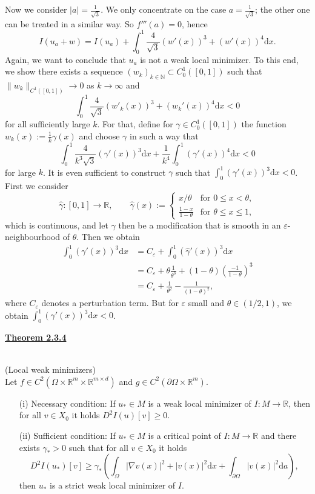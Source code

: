 \begin{itemize}
	Now we consider $\lvert a\rvert=\frac{1}{\sqrt{3}}$. We only concentrate on the case $a=\frac{1}{\sqrt{3}}$; the other one can be treated in a similar way. So $f'''(a)=0$, hence
	\[I(u_a+w)=I(u_a)+\int_0^1{\frac{4}{\sqrt{3}}(w'(x))^3+(w'(x))^4\mathrm{d}x}.\]
	Again, we want to conclude that $u_a$ is not a weak local minimizer. To this end, we show there exists a sequence $(w_k)_{k\in\mathbb{N}}\subset C_0^1([0,1])$ such that $\lVert w_k\rVert_{C^1([0,1])}\to0$ as $k\to\infty$ and
	\[\int_0^1{\frac{4}{\sqrt{3}}(w'_k(x))^3+(w_k'(x))^4\mathrm{d}x}<0\]
	for all sufficiently large $k$. For that, define for $\gamma\in C_0^1([0,1])$ the function $w_k(x):=\frac{1}{k}\gamma(x)$ and choose $\gamma$ in such a way that
	\[\int_0^1{\frac{4}{k^3\sqrt{3}}(\gamma'(x))^3\mathrm{d}x}+\frac{1}{k^4}\int_0^1{(\gamma'(x))^4\mathrm{d}x}<0\]
	for large $k$. It is even sufficient to construct $\gamma$ such that $\int_0^1{(\gamma'(x))^3\mathrm{d}x}<0$. First we consider
	\[\hat{\gamma}:[0,1]\longrightarrow\mathbb{R},\qquad\hat{\gamma}(x):=\left\{\begin{array}{rl}
		x/\theta&\text{for }0\leq x<\theta,\\
		\frac{1-x}{1-\theta}&\text{for }\theta\leq x\leq 1,
	\end{array}\right.\]
	which is continuous, and let $\gamma$ then be a modification that is smooth in an $\varepsilon$-neighbourhood of $\theta$. Then we obtain
	\begin{align*}
		\int_0^1{(\gamma'(x))^3\mathrm{d}x}&=C_\varepsilon+\int_0^1{(\hat{\gamma}'(x))^3\mathrm{d}x}\\
		&=C_\varepsilon+\theta\frac{1}{\theta^3}+(1-\theta)\left(\frac{-1}{1-\theta}\right)^3\\
		&=C_\varepsilon+\frac{1}{\theta^2}-\frac{1}{(1-\theta)^2},
	\end{align*}
	where $C_\varepsilon$ denotes a perturbation term. But for $\varepsilon$ small and $\theta\in(1/2,1)$, we obtain $\int_0^1{(\gamma'(x))^3\mathrm{d}x}<0$.\\[11pt]
\end{itemize}

\hypertarget{theorem_2_3_4}{\textbf{\underline{Theorem 2.3.4}}}\\
(Local weak minimizers)\\
Let $f\in C^2(\Omega\times\mathbb{R}^m\times\mathbb{R}^{m\times d})$ and $g\in C^2(\partial\Omega\times\mathbb{R}^m)$.
\begin{itemize}
	\item[(i)] Necessary condition: If $u_*\in M$ is a weak local minimizer of $I:M\longrightarrow\mathbb{R}$, then for all $v\in X_0$ it holds $D^2I(u)[v]\geq0$.
	\item[(ii)] Sufficient condition: If $u_*\in M$ is a critical point of $I:M\longrightarrow\mathbb{R}$ and there exists $\gamma_*>0$ such that for all $v\in X_0$ it holds
	\[D^2I(u_*)[v]\geq\gamma_*\left(\int_\Omega{\lvert\nabla v(x)\rvert^2+\lvert v(x)\rvert^2\mathrm{d}x}+\int_{\partial\Omega}{\lvert v(x)\rvert^2\mathrm{d}a}\right),\]
	then $u_*$ is a strict weak local minimizer of $I$.\\
\end{itemize}

